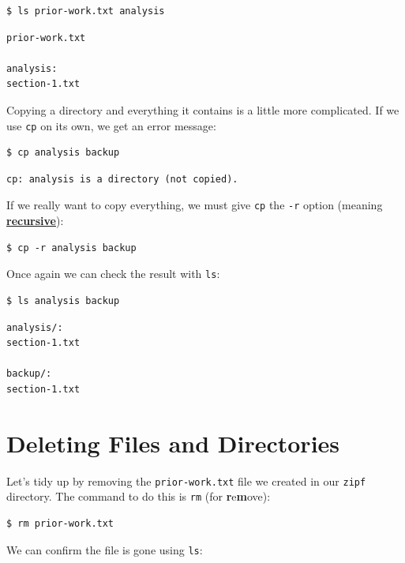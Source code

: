 \documentclass[
]{krantz}
\newcommand{\gref}[2]{\hyperlink{#2}{\textbf{#1}}}
\begin{document}
\begin{verbatim}
$ ls prior-work.txt analysis
\end{verbatim}

\begin{verbatim}
prior-work.txt

analysis:
section-1.txt
\end{verbatim}

Copying a directory and everything it contains is a little more complicated.
If we use \texttt{cp} on its own,
we get an error message:

\begin{verbatim}
$ cp analysis backup
\end{verbatim}

\begin{verbatim}
cp: analysis is a directory (not copied).
\end{verbatim}

If we really want to copy everything,
we must give \texttt{cp} the \texttt{-r} option (meaning \gref{recursive}{recursion}):

\begin{verbatim}
$ cp -r analysis backup
\end{verbatim}

Once again we can check the result with \texttt{ls}:

\begin{verbatim}
$ ls analysis backup
\end{verbatim}

\begin{verbatim}
analysis/:
section-1.txt

backup/:
section-1.txt
\end{verbatim}

\hypertarget{bash-basics-rm}{%
\section{Deleting Files and Directories}\label{bash-basics-rm}}

Let's tidy up by removing the \texttt{prior-work.txt} file we created in our \texttt{zipf} directory.
The command to do this is \texttt{rm} (for \textbf{r}e\textbf{m}ove):

\begin{verbatim}
$ rm prior-work.txt
\end{verbatim}

We can confirm the file is gone using \texttt{ls}:
\end{document}
